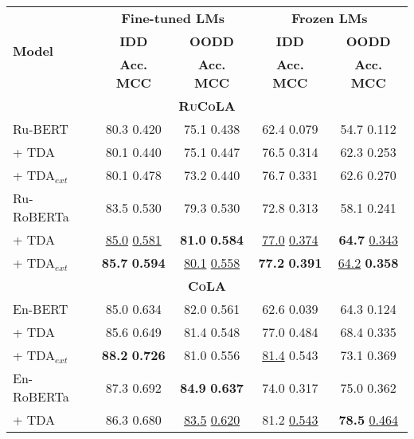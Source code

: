 \documentclass[11pt]{article}
\begin{document}
\begin{table}[t!]
\scriptsize
\centering
\newcommand{\hsp}{\hspace{4pt}}
\setlength{\tabcolsep}{2pt}
\begin{tabular}{@{}lcccc@{}} 
\toprule
\multirow{3}{*}{\textbf{Model}}  &
\multicolumn{2}{c}{\textbf{Fine-tuned LMs}} & \multicolumn{2}{c}{\textbf{Frozen LMs}} \\[0.4ex]

&  \textbf{IDD} & \textbf{OODD}  & \textbf{IDD} & \textbf{OODD} \\ [0.4ex]

&  \textbf{Acc.} \hsp \textbf{MCC} & \textbf{Acc.} \hsp \textbf{MCC}  & \textbf{Acc.} \hsp \textbf{MCC} & \textbf{Acc.} \hsp \textbf{MCC} \\
\midrule


\multicolumn{5}{c}{\textbf{\textsc{RuCoLA}}} \\ 
\midrule
Ru-BERT  & 80.3 \hsp 0.420 & 75.1 \hsp 0.438  &  62.4 \hsp 0.079 & 54.7 \hsp 0.112 \\
+ TDA & 80.1 \hsp 0.440  &  75.1 \hsp 0.447 & 76.5 \hsp 0.314 & 62.3 \hsp 0.253 \\ 
+ TDA$_{ext}$ & 80.1 \hsp 0.478 & 73.2 \hsp 0.440 & 76.7 \hsp 0.331 & 62.6 \hsp 0.270 \\ 
\midrule
Ru-RoBERTa & 83.5 \hsp 0.530 & 79.3 \hsp 0.530  &  72.8 \hsp 0.313 & 58.1 \hsp 0.241 \\
+ TDA & \underline{85.0} \hsp \underline{0.581}  & \textbf{81.0} \hsp \textbf{0.584} & \underline{77.0} \hsp \underline{0.374} & \textbf{64.7} \hsp \underline{0.343} \\ 
+ TDA$_{ext}$ & \textbf{85.7} \hsp \textbf{0.594} & \underline{80.1} \hsp \underline{0.558} & \textbf{77.2} \hsp \textbf{0.391} & \underline{64.2} \hsp \textbf{0.358} \\ 
\midrule
\multicolumn{5}{c}{\textbf{\textsc{CoLA}}} \\
\midrule
En-BERT & 85.0 \hsp 0.634 & 82.0 \hsp 0.561  & 62.6 \hsp 0.039 & 64.3 \hsp 0.124 \\
+ TDA  & 85.6 \hsp 0.649 & 81.4 \hsp 0.548 & 77.0 \hsp 0.484 & 68.4 \hsp 0.335 \\ 
+ TDA$_{ext}$ & \textbf{88.2} \hsp \textbf{0.726} & 81.0 \hsp 0.556 & \underline{81.4} \hsp 0.543 & 73.1 \hsp 0.369 \\ 
\midrule
En-RoBERTa & 87.3 \hsp 0.692 & \textbf{84.9} \hsp \textbf{0.637}  & 74.0 \hsp 0.317 & 75.0 \hsp 0.362 \\
+ TDA  & 86.3 \hsp 0.680 & \underline{83.5} \hsp \underline{0.620} & 81.2 \hsp \underline{0.543} & \textbf{78.5} \hsp \underline{0.464} \\ 

\end{tabular}
\end{table}
\end{document}

